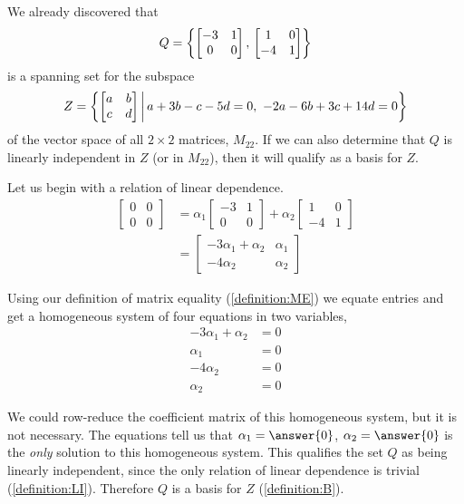 \documentclass{ximera}
\begin{document}
\begin{example}
  We already discovered that
  \[
    Q=\left\{
      \begin{bmatrix}-3&1\\0&0\end{bmatrix},\,
      \begin{bmatrix}1&0\\-4&1\end{bmatrix}
    \right\}
  \]
  is a spanning set for the subspace
  \[
    Z=\setparts{\begin{bmatrix}a&b\\c&d\end{bmatrix}}{a+3b-c-5d=0,\ -2a-6b+3c+14d=0}
  \]
  of the vector space of all $2\times 2$ matrices, $M_{22}$.  If we
  can also determine that $Q$ is linearly independent in $Z$ (or in
  $M_{22}$), then it will qualify as a basis for $Z$.

  Let us begin with a relation of linear dependence.
  \begin{align*}
    \begin{bmatrix}0&0\\0&0\end{bmatrix}
                         &=
                           \alpha_1\begin{bmatrix}-3&1\\0&0\end{bmatrix}+
                                                           \alpha_2\begin{bmatrix}1&0\\-4&1\end{bmatrix}\\
                    &=\begin{bmatrix}
                      -3\alpha_1 +\alpha_2  & \alpha_1\\
                      -4\alpha_2 & \alpha_2
                    \end{bmatrix}
  \end{align*}
  
  Using our definition of matrix equality (\ref{definition:ME}) we
  equate entries and get a homogeneous system of four equations in two
  variables,
  \begin{align*}
    -3\alpha_1 +\alpha_2&=0\\
    \alpha_1&=0\\
    -4\alpha_2&=0\\
    \alpha_2&=0
  \end{align*}

  We could row-reduce the coefficient matrix of this homogeneous
  system, but it is not necessary.  The equations tell us that
  $\alpha_1=\answer{0}$, $\alpha_2=\answer{0}$ is the \textit{only}
  solution to this homogeneous system.  This qualifies the set $Q$ as
  being linearly independent, since the only relation of linear
  dependence is trivial (\ref{definition:LI}).  Therefore $Q$ is a
  basis for $Z$ (\ref{definition:B}).
\end{example}
\end{document}

